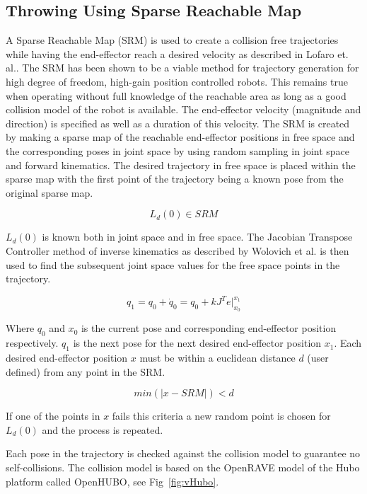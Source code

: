 \subsection{Throwing Using Sparse Reachable Map}\label{sec:sec:srm}

A Sparse Reachable Map (SRM) is used to create a collision free trajectories while having the end-effector reach a desired velocity as described in Lofaro et. al.\cite{dlofaro-srm}.
The SRM has been shown to be a viable method for trajectory generation for high degree of freedom, high-gain position controlled robots.  This remains true when operating without full knowledge of the reachable area as long as a good collision model of the robot is available. 
The end-effector velocity (magnitude and direction) is specified as well as a duration of this velocity. 
The SRM is created by making a sparse map of the reachable end-effector positions in free space and the corresponding poses in joint space by using random sampling in joint space and forward kinematics. 
The desired trajectory in free space is placed within the sparse map with the first point of the trajectory being a known pose from the original sparse map. 

\begin{equation}
L_d(0) \in SRM
\end{equation}

$L_d(0)$ is known both in joint space and in free space.
The Jacobian Transpose Controller method of inverse kinematics as described by Wolovich et al.\cite{4048118} is then used to find the subsequent joint space values for the free space points in the trajectory. 

\begin{equation}
q_1 = q_0 + \dot{q}_0 = q_0 + kJ^Te|_{x_0}^{x_1}
\end{equation}

Where $q_0$ and $x_0$ is the current pose and corresponding end-effector position respectively.  $q_1$ is the next pose for the next desired end-effector position $x_1$.
Each desired end-effector position $x$ must be within a euclidean distance $d$ (user defined) from any point in the SRM.

\begin{equation}
min \left(|x - SRM| \right) < d
\end{equation}

If one of the points in $x$ fails this criteria a new random point is chosen for $L_d(0)$ and the process is repeated.

Each pose in the trajectory is checked against the collision model to guarantee no self-collisions.  The collision model is based on the OpenRAVE model of the Hubo platform called OpenHUBO, see Fig~\ref{fig:vHubo}.

